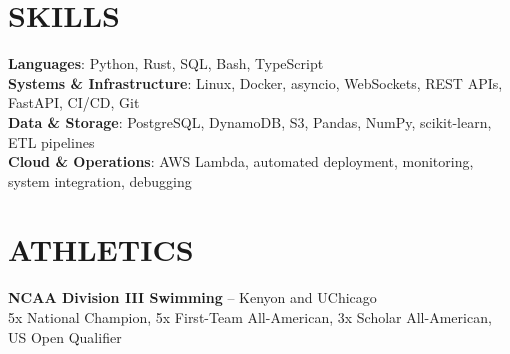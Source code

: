 \documentclass[letterpaper,11pt]{article}
\begin{document}
\section{SKILLS}
 \begin{itemize}[leftmargin=0in, label={}]
    \small{\item{
     \textbf{Languages}{: Python, Rust, SQL, Bash, TypeScript}\vspace{2pt} \\
     \textbf{Systems \& Infrastructure}{: Linux, Docker, asyncio, WebSockets, REST APIs, FastAPI, CI/CD, Git}\vspace{2pt} \\
     \textbf{Data \& Storage}{: PostgreSQL, DynamoDB, S3, Pandas, NumPy, scikit-learn, ETL pipelines}\vspace{2pt} \\
     \textbf{Cloud \& Operations}{: AWS Lambda, automated deployment, monitoring, system integration, debugging}
    }}
 \end{itemize}

\section{ATHLETICS}
 \begin{itemize}[leftmargin=0in, label={}]
    \small{\item{
     \textbf{NCAA Division III Swimming} -- Kenyon and UChicago \\
     5x National Champion, 5x First-Team All-American, 3x Scholar All-American, US Open Qualifier
    }}
 \end{itemize}

\end{document}

